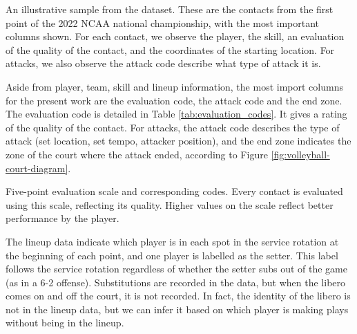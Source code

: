 \documentclass[USenglish]{article}
\theoremstyle{dgthm}
\theoremstyle{dgdef}
\begin{document}
\begin{table}
    \centering
    
    \caption{An illustrative sample from the dataset. These are the contacts from the first point of the 2022 NCAA national championship, with the most important columns shown. For each contact, we observe the player, the skill, an evaluation of the quality of the contact, and the coordinates of the starting location. For attacks, we also observe the attack code describe what type of attack it is.}
    \label{tab:sample-data}
\end{table}

Aside from player, team, skill and lineup information, the most import columns for the present work are the evaluation code, the attack code and the end zone. The evaluation code is detailed in Table \ref{tab:evaluation_codes}. It gives a rating of the quality of the contact. For attacks, the attack code describes the type of attack (set location, set tempo, attacker position), and the end zone indicates the zone of the court where the attack ended, according to Figure \ref{fig:volleyball-court-diagram}.

\begin{table}
    \centering
    
    \caption{Five-point evaluation scale and corresponding codes. Every contact is evaluated using this scale, reflecting its quality. Higher values on the scale reflect better performance by the player.}
    \label{tab:evaluation_codes}
\end{table}

The lineup data indicate which player is in each spot in the service rotation at the beginning of each point, and one player is labelled as the setter. This label follows the service rotation regardless of whether the setter subs out of the game (as in a 6-2 offense). Substitutions are recorded in the data, but when the libero comes on and off the court, it is not recorded. In fact, the identity of the libero is not in the lineup data, but we can infer it based on which player is making plays without being in the lineup.
\end{document}

